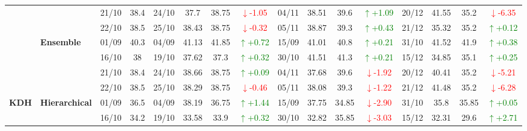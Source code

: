 {\begin{longtable}{llcc|cccc|cccc|cccc}
& 
& 21/10 & 38.4 & 24/10 & 37.7 & 38.75 & \textcolor{red}{\(\downarrow\)-1.05} & 04/11 & 38.51 & 39.6 & \textcolor{green}{\(\uparrow\)+1.09} & 20/12 & 41.55 & 35.2 & \textcolor{red}{\(\downarrow\)-6.35} \\

&
& 22/10 & 38.5 & 25/10 & 38.43 & 38.75 & \textcolor{red}{\(\downarrow\)-0.32} & 05/11 & 38.87 & 39.3 & \textcolor{green}{\(\uparrow\)+0.43} & 21/12 & 35.32 & 35.2 & \textcolor{green}{\(\uparrow\)+0.12} \\
\cmidrule(lr){2-16}


& \textbf{Ensemble}
& 01/09 & 40.3 & 04/09 & 41.13 & 41.85 & \textcolor{green}{\(\uparrow\)+0.72} & 15/09 & 41.01 & 40.8 & \textcolor{green}{\(\uparrow\)+0.21} & 31/10 & 41.52 & 41.9 & \textcolor{green}{\(\uparrow\)+0.38} \\

& 
& 16/10 & 38 & 19/10 & 37.62 & 37.3 & \textcolor{green}{\(\uparrow\)+0.32} & 30/10 & 41.51 & 41.3 & \textcolor{green}{\(\uparrow\)+0.21} & 15/12 & 34.85 & 35.1 & \textcolor{green}{\(\uparrow\)+0.25} \\

& 
& 21/10 & 38.4 & 24/10 & 38.66 & 38.75 & \textcolor{green}{\(\uparrow\)+0.09} & 04/11 & 37.68 & 39.6 & \textcolor{red}{\(\downarrow\)-1.92} & 20/12 & 40.41 & 35.2 & \textcolor{red}{\(\downarrow\)-5.21} \\

&
& 22/10 & 38.5 & 25/10 & 38.29 & 38.75 & \textcolor{red}{\(\downarrow\)-0.46} & 05/11 & 38.08 & 39.3 & \textcolor{red}{\(\downarrow\)-1.22} & 21/12 & 41.48 & 35.2 & \textcolor{red}{\(\downarrow\)-6.28} \\
\midrule



\multirow{12}{*}{\textbf{KDH}} 
& \textbf{Hierarchical}
& 01/09 & 36.5 & 04/09 & 38.19 & 36.75 & \textcolor{green}{\(\uparrow\)+1.44} & 15/09 & 37.75 & 34.85 & \textcolor{red}{\(\downarrow\)-2.90} & 31/10 & 35.8 & 35.85 & \textcolor{green}{\(\uparrow\)+0.05} \\

&
& 16/10 & 34.2 & 19/10 & 33.58 & 33.9 & \textcolor{green}{\(\uparrow\)+0.32} & 30/10 & 32.82 & 35.85 & \textcolor{red}{\(\downarrow\)-3.03} & 15/12 & 32.31 & 29.6 & \textcolor{green}{\(\uparrow\)+2.71} \\


\end{longtable}}
